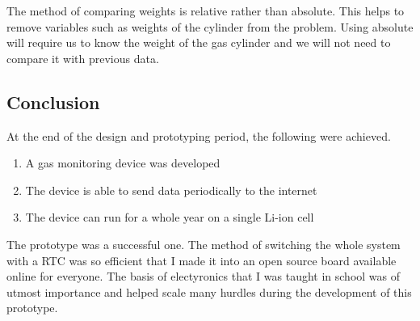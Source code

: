 The method of comparing weights is relative rather than absolute. This helps to remove variables such as weights of the cylinder from the problem. Using absolute will require us to know the weight of the gas cylinder and we will not need to compare it with previous data. 

\subsection{Conclusion}
At the end of the design and prototyping period, the following were achieved.
\begin{enumerate}
\item A gas monitoring device was developed
\item The device is able to send data periodically to the internet
\item The device can run for a whole year on a single Li-ion cell
\end{enumerate}

The prototype was a successful one. The method of switching the whole system with a RTC was so efficient that I made it into an open source board available online for everyone. The basis of electyronics that I was taught in school was of utmost importance and helped scale many hurdles during the development of this prototype.




